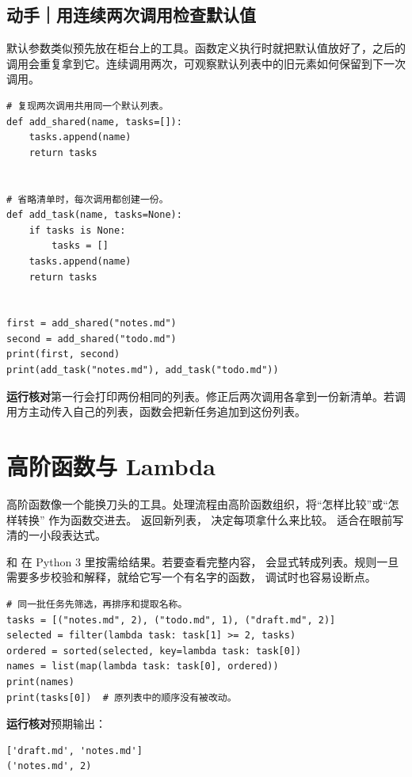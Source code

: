 \par

\subsection*{动手｜用连续两次调用检查默认值}

默认参数类似预先放在柜台上的工具。函数定义执行时就把默认值放好了，之后的调用会重复拿到它。连续调用两次，可观察默认列表中的旧元素如何保留到下一次调用。

\begin{lstlisting}[title={\code{task_defaults.py}}]
# 复现两次调用共用同一个默认列表。
def add_shared(name, tasks=[]):
    tasks.append(name)
    return tasks


# 省略清单时，每次调用都创建一份。
def add_task(name, tasks=None):
    if tasks is None:
        tasks = []
    tasks.append(name)
    return tasks


first = add_shared("notes.md")
second = add_shared("todo.md")
print(first, second)
print(add_task("notes.md"), add_task("todo.md"))
\end{lstlisting}

\textbf{运行核对}\enspace 第一行会打印两份相同的列表。修正后两次调用各拿到一份新清单。若调用方主动传入自己的列表，函数会把新任务追加到这份列表。

\section{高阶函数与 Lambda}

高阶函数像一个能换刀头的工具。处理流程由高阶函数组织，将“怎样比较”或“怎样转换”
作为函数交进去。 返回新列表， 决定每项拿什么来比较。
 适合在眼前写清的一小段表达式。

 和  在 Python 3 里按需给结果。若要查看完整内容，
会显式转成列表。规则一旦需要多步校验和解释，就给它写一个有名字的函数，
调试时也容易设断点。


\begin{lstlisting}[title={\code{rank_tasks.py}}]
# 同一批任务先筛选，再排序和提取名称。
tasks = [("notes.md", 2), ("todo.md", 1), ("draft.md", 2)]
selected = filter(lambda task: task[1] >= 2, tasks)
ordered = sorted(selected, key=lambda task: task[0])
names = list(map(lambda task: task[0], ordered))
print(names)
print(tasks[0])  # 原列表中的顺序没有被改动。
\end{lstlisting}


\textbf{运行核对}\enspace 预期输出：
\begin{lstlisting}[language={},numbers=none]
['draft.md', 'notes.md']
('notes.md', 2)
\end{lstlisting}

